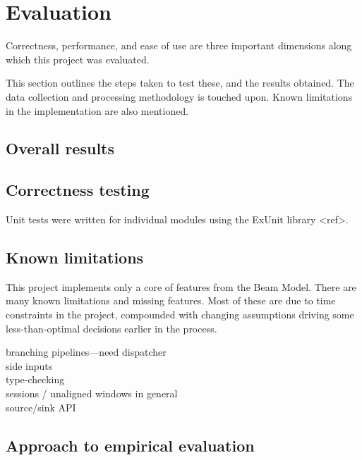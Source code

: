 \chapter{Evaluation}\label{ch:eval}

Correctness, performance, and ease of use are three important dimensions along which this project was evaluated.

This section outlines the steps taken to test these, and the results obtained.
The data collection and processing methodology is touched upon.
Known limitations in the implementation are also mentioned.


\section{Overall results}\label{sec:eval:overall}



\section{Correctness testing}\label{sec:eval:correctness}

Unit tests were written for individual modules using the ExUnit library <ref>.

\section{Known limitations}\label{sec:eval:limitations}

This project implements only a core of features from the Beam Model.
There are many known limitations and missing features.
Most of these are due to time constraints in the project, compounded with changing assumptions driving some less-than-optimal decisions earlier in the process.

branching pipelines---need dispatcher\\
side inputs\\
type-checking\\
sessions / unaligned windows in general\\
source/sink API\\



\section{Approach to empirical evaluation}\label{sec:eval:approach}

